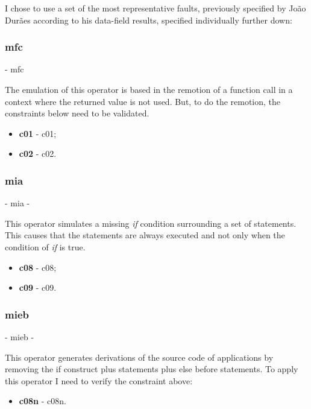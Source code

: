 I chose to use a set of the most representative faults, previously specified by João Durães\cite{duraes2006emulation} according to his data-field results, specified individually further down:

	\subsubsection{\textbf{\acs{mfc}}} - \Acl{mfc}
	\hypertarget{mfc}{}

	The emulation of this operator is based in the remotion of a function call in a context where the returned value is not used. But, to do the remotion, the constraints below need to be validated.
	\begin{itemize}
		\item \textbf{\acs{c01}} - \Acl{c01};
		\item \textbf{\acs{c02}} - \Acl{c02}.
	\end{itemize}

	\subsubsection{\textbf{\acs{mia}}} - \Acl{mia} - 
	\hypertarget{mia}{}

	This operator simulates a missing \textit{if} condition surrounding a set of statements. This causes that the statements are always executed and not only when the condition of \textit{if} is true.
	\begin{itemize}
		\item \textbf{\acs{c08}} - \Acl{c08};
		\item \textbf{\acs{c09}} - \Acl{c09}.
	\end{itemize}

	\subsubsection{\textbf{\acs{mieb}}} - \Acl{mieb} - 
	\hypertarget{mieb}{}

	This operator generates derivations of the source code of applications by removing the if construct plus statements plus else before statements. To apply this operator I need to verify the constraint above:
	\begin{itemize}
		\item \textbf{\acs{c08n}} - \Acl{c08n}.
	\end{itemize}

